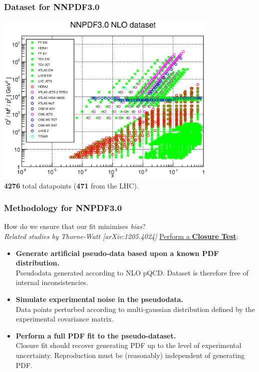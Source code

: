 \documentclass[10pt]{beamer}
\begin{document}
\begin{frame}
\frametitle{Dataset for NNPDF3.0}
\begin{center}
\includegraphics[width=0.8\textwidth]{figures/30kin.eps}\\
\textbf{4276} total datapoints (\textbf{471} from the LHC).
\end{center}
\end{frame}


\begin{frame}
\frametitle{Methodology for NNPDF3.0}
How do we ensure that our fit minimises \emph{bias}?\\
\emph{Related studies by Thorne-Watt [arXiv:1205.4024]}
\vskip15pt
\underline{Perform a \textbf{Closure Test}}:

\begin{itemize}
\item<1-> \textbf{Generate artificial pseudo-data based upon a known PDF distribution.}\\
		\small Pseudodata generated according to NLO pQCD. Dataset is therefore free of internal inconsistencies.
		\vskip15pt
		
\item<1-> \textbf{Simulate experimental noise in the pseudodata. }\\
			\small Data points perturbed according to multi-gaussian distribution defined by the experimental
			covariance matrix.
			\vskip15pt
\item<1-> \textbf{Perform a full PDF fit to the pseudo-dataset.}\\
		\small Closure fit should recover generating PDF up to the level of experimental uncertainty. Reproduction must be (reasonably) independent of generating PDF.
\end{itemize}

\end{frame}
\end{document}
